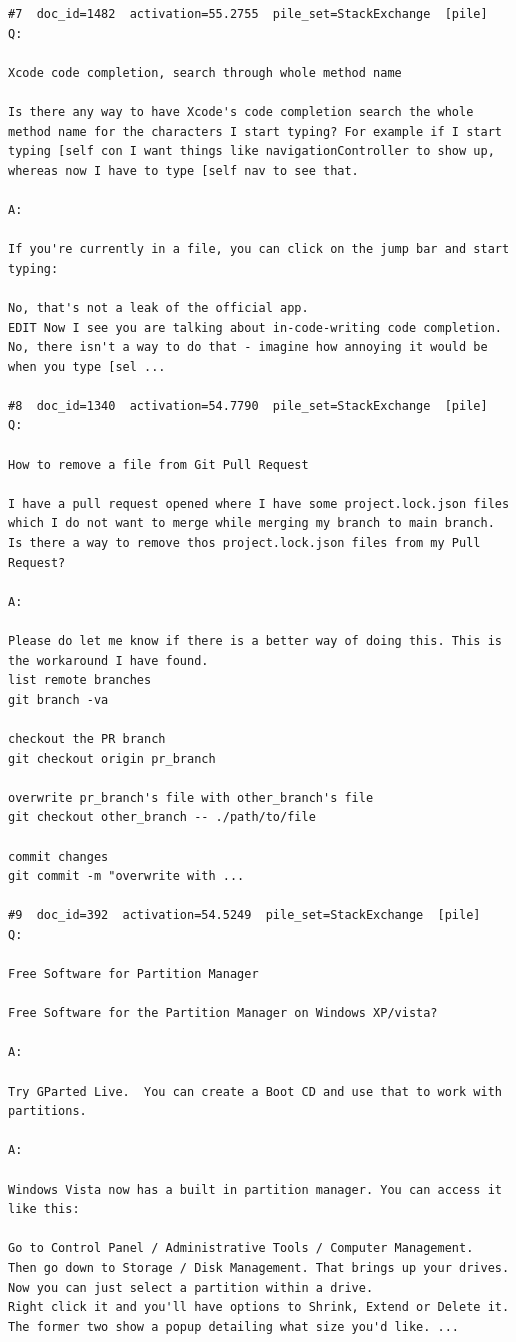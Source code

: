 \begin{verbatim}
#7  doc_id=1482  activation=55.2755  pile_set=StackExchange  [pile]
Q:

Xcode code completion, search through whole method name

Is there any way to have Xcode's code completion search the whole method name for the characters I start typing? For example if I start typing [self con I want things like navigationController to show up, whereas now I have to type [self nav to see that.

A:

If you're currently in a file, you can click on the jump bar and start typing:

No, that's not a leak of the official app.
EDIT Now I see you are talking about in-code-writing code completion. No, there isn't a way to do that - imagine how annoying it would be when you type [sel ...

#8  doc_id=1340  activation=54.7790  pile_set=StackExchange  [pile]
Q:

How to remove a file from Git Pull Request

I have a pull request opened where I have some project.lock.json files which I do not want to merge while merging my branch to main branch. Is there a way to remove thos project.lock.json files from my Pull Request?

A:

Please do let me know if there is a better way of doing this. This is the workaround I have found.
list remote branches
git branch -va

checkout the PR branch
git checkout origin pr_branch

overwrite pr_branch's file with other_branch's file
git checkout other_branch -- ./path/to/file

commit changes
git commit -m "overwrite with ...

#9  doc_id=392  activation=54.5249  pile_set=StackExchange  [pile]
Q:

Free Software for Partition Manager

Free Software for the Partition Manager on Windows XP/vista?  

A:

Try GParted Live.  You can create a Boot CD and use that to work with partitions.

A:

Windows Vista now has a built in partition manager. You can access it like this:

Go to Control Panel / Administrative Tools / Computer Management. 
Then go down to Storage / Disk Management. That brings up your drives. 
Now you can just select a partition within a drive.
Right click it and you'll have options to Shrink, Extend or Delete it. The former two show a popup detailing what size you'd like. ...


\end{verbatim}

